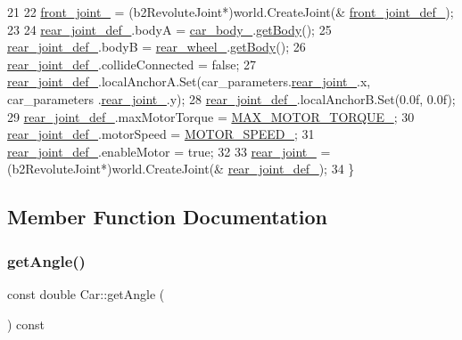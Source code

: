 \begin{DoxyCode}
21 
22     \hyperlink{classCar_a65195e0f8bdcb242616b6c285d7ff07a}{front\_joint\_} = (b2RevoluteJoint*)world.CreateJoint(&
      \hyperlink{classCar_a4e2939a9c523e2e264ea2377a4829f7c}{front\_joint\_def\_});
23 
24     \hyperlink{classCar_a6d59c94896a5b765761b89b0ae3b8e64}{rear\_joint\_def\_}.bodyA = \hyperlink{classCar_a6a0d40752a134fb4f0693a28a4e64a0d}{car\_body\_}.\hyperlink{classCarBody_abf98252ba6d666ce771acfdf7c6d66cb}{getBody}();
25     \hyperlink{classCar_a6d59c94896a5b765761b89b0ae3b8e64}{rear\_joint\_def\_}.bodyB = \hyperlink{classCar_a2c29a444d66ee10134352516e42c3e0d}{rear\_wheel\_}.\hyperlink{classWheel_af278d5423746dfc46834ec6b225d4e17}{getBody}();
26     \hyperlink{classCar_a6d59c94896a5b765761b89b0ae3b8e64}{rear\_joint\_def\_}.collideConnected = \textcolor{keyword}{false};
27     \hyperlink{classCar_a6d59c94896a5b765761b89b0ae3b8e64}{rear\_joint\_def\_}.localAnchorA.Set(car\_parameters.\hyperlink{classCarParameters_aec19cf9d1c6ab5f00ac5ff166ee0015a}{rear\_joint\_}.x, car\_parameters
      .\hyperlink{classCarParameters_aec19cf9d1c6ab5f00ac5ff166ee0015a}{rear\_joint\_}.y);
28     \hyperlink{classCar_a6d59c94896a5b765761b89b0ae3b8e64}{rear\_joint\_def\_}.localAnchorB.Set(0.0f, 0.0f);
29     \hyperlink{classCar_a6d59c94896a5b765761b89b0ae3b8e64}{rear\_joint\_def\_}.maxMotorTorque = \hyperlink{classCar_a70cd98e49fe96eec0bc4f0c414fd8e19}{MAX\_MOTOR\_TORQUE\_};
30     \hyperlink{classCar_a6d59c94896a5b765761b89b0ae3b8e64}{rear\_joint\_def\_}.motorSpeed = \hyperlink{classCar_a371b4dcd77eb566677d633db4dd457ae}{MOTOR\_SPEED\_};
31     \hyperlink{classCar_a6d59c94896a5b765761b89b0ae3b8e64}{rear\_joint\_def\_}.enableMotor = \textcolor{keyword}{true};
32 
33     \hyperlink{classCar_ac916d27d34a5a9aa07129894b79f1aa7}{rear\_joint\_} = (b2RevoluteJoint*)world.CreateJoint(&
      \hyperlink{classCar_a6d59c94896a5b765761b89b0ae3b8e64}{rear\_joint\_def\_});
34 \}
\end{DoxyCode}


\subsection{Member Function Documentation}
\mbox{\label{classCar_aeb9ab35989aee09eecccc786ae08c89c}} 
\subsubsection{\texorpdfstring{get\+Angle()}{getAngle()}}
{\footnotesize\ttfamily const double Car\+::get\+Angle (\begin{DoxyParamCaption}{ }\end{DoxyParamCaption}) const}



